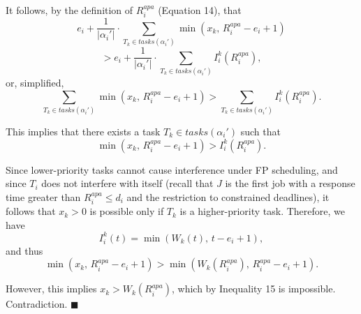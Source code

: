It follows, by the definition of $R_i^{apa}$ (Equation 14), that
\[
e_i + \frac{1}{|\alpha_i'|} \cdot \sum_{T_k \in tasks(\alpha_i')} \min(x_k,\, R_i^{apa} - e_i + 1)
\]
\[
> e_i + \frac{1}{|\alpha_i'|} \cdot \sum_{T_k \in tasks(\alpha_i')} I_i^k(R_i^{apa}),
\]
or, simplified,
\[
\sum_{T_k \in tasks(\alpha_i')} \min(x_k,\, R_i^{apa} - e_i + 1) > \sum_{T_k \in tasks(\alpha_i')} I_i^k(R_i^{apa}).
\]

This implies that there exists a task $T_k \in tasks(\alpha_i')$ such that
\[
\min(x_k,\, R_i^{apa} - e_i + 1) > I_i^k(R_i^{apa}).
\]

Since lower-priority tasks cannot cause interference under FP scheduling, and since $T_i$ does not interfere with itself (recall that $J$ is the first job with a response time greater than $R_i^{apa} \leq d_i$ and the restriction to constrained deadlines), it follows that $x_k > 0$ is possible only if $T_k$ is a higher-priority task. Therefore, we have
\[
I_i^k(t) = \min(W_k(t),\, t - e_i + 1),
\]
and thus
\[
\min(x_k,\, R_i^{apa} - e_i + 1) > \min(W_k(R_i^{apa}),\, R_i^{apa} - e_i + 1).
\]

However, this implies $x_k > W_k(R_i^{apa})$, which by Inequality 15 is impossible. Contradiction. \hfill $\blacksquare$